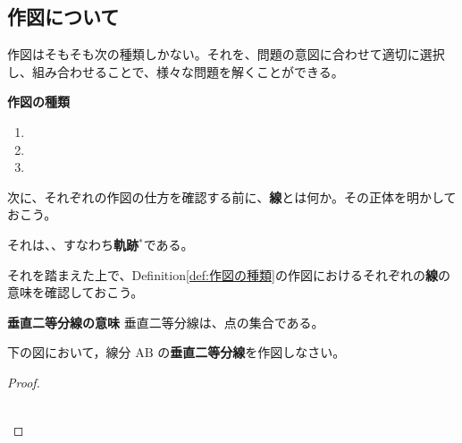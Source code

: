\subsection{作図について}
    作図はそもそも次の\fitblank[3]{}種類しかない。それを、問題の意図に合わせて適切に選択し、組み合わせることで、様々な問題を解くことができる。

    \begin{definitionbox}{\textbf{作図の種類}}
        \label{def:作図の種類}
        \begin{enumerate}
            \item {}
            \item {}
            \item {}
        \end{enumerate}
    \end{definitionbox}
\vspace{1em}

    次に、それぞれの作図の仕方を確認する前に、\textbf{線}とは何か。その正体を明かしておこう。

    それは、\fitblankbf[条件を満たす点の集合]{}、すなわち\textbf{軌跡$^{*}$}である。

    それを踏まえた上で、Definition\ref{def:作図の種類}の作図におけるそれぞれの\textbf{線}の意味を確認しておこう。

\vspace{1em}
    \begin{theorembox}{\textbf{垂直二等分線の意味}}
        \label{thm:垂直二等分線の意味}
        垂直二等分線は、\fitblankbf[2点間の距離が等しい]{}点の集合である。
    \end{theorembox}

    \begin{example}[【例題 1】]
        下の図において，線分 $\mathrm{AB}$ の\textbf{垂直二等分線}を作図しなさい。
    \end{example}

    \begin{proof}\mbox{}\\
        \\
        \begin{center}
        \end{center}
    \end{proof}
\newpage

